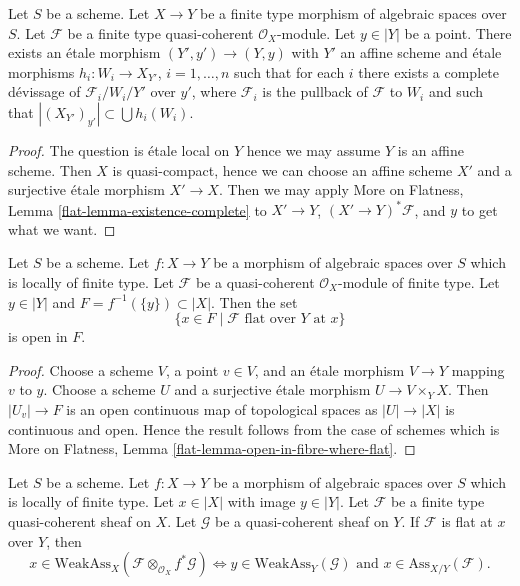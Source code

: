 \begin{lemma}
\label{lemma-existence-complete}
Let $S$ be a scheme.
Let $X \to Y$ be a finite type morphism of algebraic spaces over $S$.
Let $\mathcal{F}$ be a finite type quasi-coherent $\mathcal{O}_X$-module.
Let $y \in |Y|$ be a point. There exists an \'etale morphism
$(Y', y') \to (Y, y)$ with $Y'$ an affine scheme and \'etale morphisms
$h_i : W_i \to X_{Y'}$, $i = 1, \ldots, n$ such that for each
$i$ there exists a complete d\'evissage of $\mathcal{F}_i/W_i/Y'$ over $y'$,
where $\mathcal{F}_i$ is the pullback of $\mathcal{F}$ to $W_i$
and such that $|(X_{Y'})_{y'}| \subset \bigcup h_i(W_i)$.
\end{lemma}

\begin{proof}
The question is \'etale local on $Y$ hence we may assume $Y$
is an affine scheme. Then $X$ is quasi-compact, hence we can
choose an affine scheme $X'$ and a surjective \'etale morphism
$X' \to X$. Then we may apply
More on Flatness, Lemma \ref{flat-lemma-existence-complete}
to $X' \to Y$, $(X' \to Y)^*\mathcal{F}$, and $y$ to
get what we want.
\end{proof}

\begin{lemma}
\label{lemma-open-in-fibre-where-flat}
Let $S$ be a scheme.
Let $f : X \to Y$ be a morphism of algebraic spaces over $S$
which is locally of finite type.
Let $\mathcal{F}$ be a quasi-coherent $\mathcal{O}_X$-module of finite type.
Let $y \in |Y|$ and $F = f^{-1}(\{y\}) \subset |X|$. Then the set
$$
\{x \in F \mid \mathcal{F} \text{ flat over }Y\text{ at }x\}
$$
is open in $F$.
\end{lemma}

\begin{proof}
Choose a scheme $V$, a point $v \in V$, and an \'etale morphism $V \to Y$
mapping $v$ to $y$. Choose a scheme $U$ and a surjective \'etale
morphism $U \to V \times_Y X$. Then $|U_v| \to F$ is an open continuous
map of topological spaces as $|U| \to |X|$ is continuous and open.
Hence the result follows from the case of schemes which is
More on Flatness, Lemma \ref{flat-lemma-open-in-fibre-where-flat}.
\end{proof}

\begin{lemma}
\label{lemma-bourbaki-finite-type-general-base-at-point}
Let $S$ be a scheme.
Let $f : X \to Y$ be a morphism of algebraic spaces over $S$ which is
locally of finite type. Let $x \in |X|$ with image $y \in |Y|$.
Let $\mathcal{F}$ be a finite type quasi-coherent sheaf on $X$.
Let $\mathcal{G}$ be a quasi-coherent sheaf on $Y$.
If $\mathcal{F}$ is flat at $x$ over $Y$, then
$$
x \in \text{WeakAss}_X(\mathcal{F} \otimes_{\mathcal{O}_X} f^*\mathcal{G})
\Leftrightarrow
y \in \text{WeakAss}_Y(\mathcal{G})
\text{ and }
x \in \text{Ass}_{X/Y}(\mathcal{F}).
$$
\end{lemma}

